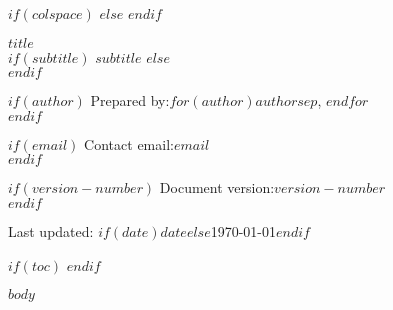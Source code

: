 \documentclass[
$if(fontsize)$
  $fontsize$,
$endif$
$if(papersize)$
  $papersize$paper,
$endif$
$for(classoption)$
  $classoption$$sep$,
$endfor$
]{$documentclass$}
\begin{document}
\pagestyle{otherpages}
\thispagestyle{firstpage}
\afterpage{\aftergroup\restoregeometry}

$if(colspace)$
  \setlength{\tabcolsep}{$colspace$}
$else$
  \setlength{\tabcolsep}{12pt}
$endif$

{\Large\bf $title$}\\[4pt]
$if(subtitle)$
  {\normalsize $subtitle$}
$else$
  \phantom{text}\\[-32pt]
$endif$

{\normalsize{%
$if(author)$
  Prepared by:\;$for(author)$$author$$sep$, $endfor$\\[-20pt]
$endif$}}

{\normalsize{%
$if(email)$
  Contact email:\;$email$\\[-20pt]
$endif$}}

{\normalsize{%
$if(version-number)$
  Document version:\;\texttt{$version-number$}\\[-20pt]
$endif$}}

Last updated: $if(date)$$date$$else$\today$endif$
\vspace{1mm}


$if(toc)$
  \setcounter{page}{1}
  \setcounter{tocdepth}{2}
  \tableofcontents
$endif$

$body$
\end{document}
